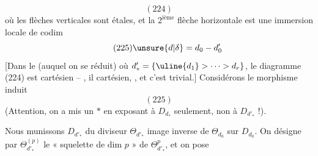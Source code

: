 \[
(224)
\]
où les flèches verticales sont étales,
et la $2^{\mathrm{ième}}$ flèche horizontale est une
immersion locale de codim 
\[
\tag{225}\unsure{d|\delta}=d_0-d'_0
\]
[Dans le  (auquel on se réduit)
où $d'_* = \{\uline{d_1}>\cdots>d_r\}$, le diagramme
(224) est cartésien -- , il
  cartésien, , et c'est trivial.]
Considérons le morphisme induit
\[
(225)
\]
(Attention, on a mis un $*$ en exposant
à $D_{d_*}$ seulement, non à $D_{d'_*}$ !).

Nous munissons $D_{d'_*}$ du diviseur
$\Theta_{d'_*}$ image inverse de $\Theta_{d_0}$ sur $D_{d_0}$.
On désigne par $\Theta_{d'_*}^{(p)}$ le « squelette
de dim $p$ » de $\Theta_{d'_*}^{p}$, et  on pose
